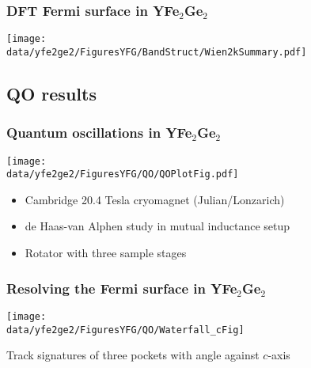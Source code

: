 \begin{frame}[plain,label=YFGFermiSurface]
\frametitle{DFT Fermi surface in YFe$_2$Ge$_2$}
\texttt{[image: \\data/yfe2ge2/FiguresYFG/BandStruct/Wien2kSummary.pdf]}
\end{frame}

\subsection{QO results}
%
%
%
%


\begin{frame}[plain,label=YFGQO]
\frametitle{Quantum oscillations in YFe$_2$Ge$_2$}
\texttt{[image: \\data/yfe2ge2/FiguresYFG/QO/QOPlotFig.pdf]}

\begin{itemize}
\item Cambridge 20.4 Tesla cryomagnet (Julian/Lonzarich)
\item de Haas-van Alphen study in mutual inductance setup
\item Rotator with three sample stages
\end{itemize}
\end{frame}

\begin{frame}[plain,label=YFGRot]
\frametitle{Resolving the Fermi surface in YFe$_2$Ge$_2$}
\texttt{[image: \\data/yfe2ge2/FiguresYFG/QO/Waterfall\_cFig]}

\vspace{2em}
\centerline{Track signatures of three pockets with angle against $c$-axis}
\end{frame}

